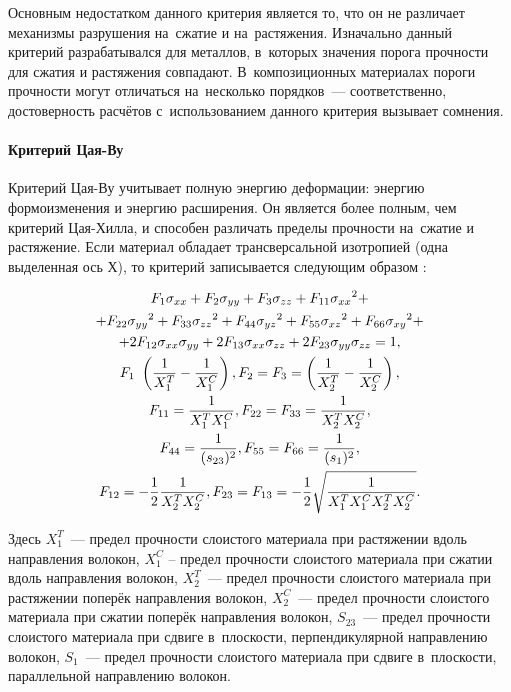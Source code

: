 \documentclass[thesis.tex]{subfiles}
\begin{document}
Основным недостатком данного критерия является то, что он не различает механизмы разрушения на~сжатие и на~растяжения.
Изначально данный критерий разрабатывался для металлов, в~которых значения порога прочности для сжатия и растяжения
совпадают. В~композиционных материалах пороги прочности могут отличаться на~несколько порядков~--- соответственно,
достоверность расчётов с~использованием данного критерия вызывает сомнения.

\paragraph{Критерий Цая-Ву}
Критерий Цая-Ву учитывает полную энергию деформации: энергию формоизменения и энергию расширения. Он является более
полным, чем критерий Цая-Хилла, и способен различать пределы прочности на~сжатие и растяжение. Если материал обладает
трансверсальной изотропией (одна выделенная ось Х), то критерий записывается следующим образом \cite{tsai1971general}:

\begin{small}
\begin{gather}
    F_1\sigma_{xx} + F_2\sigma_{yy} + F_3\sigma_{zz} + F_{11}{\sigma_{xx}}^2 + \nonumber \\
    + F_{22}{\sigma_{yy}}^2 + F_{33}{\sigma_{zz}}^2 + F_{44}{\sigma_{yz}}^2 + F_{55}{\sigma_{xz}}^2 + F_{66}{\sigma_{xy}}^2 + \nonumber \\
    + 2F_{12}\sigma_{xx}\sigma_{yy}+2F_{13}\sigma_{xx}\sigma_{zz}+2F_{23}\sigma_{yy}\sigma_{zz} = 1, \\
    F_1 \ \left( \frac{1}{X_1^T} - \frac{1}{X_1^C} \right),
    F_2=F_3=\left( \frac{1}{X_2^T} - \frac{1}{X_2^C} \right), \nonumber \\
    F_{11}=\frac{1}{X_1^T X_1^C},
    F_{22}=F_{33}=\frac{1}{X_2^T X_2^C}, \nonumber \\
    F_{44}=\frac{1}{(s_{23})^2},
    F_{55}=F_{66}=\frac{1}{(s_1)^2}, \nonumber \\
    F_{12}=-\frac{1}{2}\frac{1}{X_2^T X_2^C},
    F_{23}=F_{13}=-\frac{1}{2}\sqrt{\frac{1}{X_1^T X_1^C X_2^T X_2^C}} \nonumber.
\end{gather}
\end{small}
Здесь $X_1^T$~--- предел прочности слоистого материала при растяжении вдоль направления волокон, $X_1^C$ -- предел
прочности слоистого материала при сжатии вдоль направления волокон, $X_2^T$~--- предел прочности слоистого материала при
растяжении поперёк направления волокон, $X_2^C$~--- предел прочности слоистого материала при сжатии поперёк направления
волокон, $S_{23}$~--- предел прочности слоистого материала при сдвиге в~плоскости, перпендикулярной направлению волокон,
$S_1$~--- предел прочности слоистого материала при сдвиге в~плоскости, параллельной направлению волокон.
\end{document}
